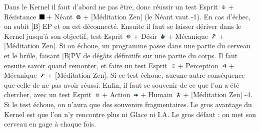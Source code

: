 \documentclass[11pt,twoside,a4paper]{article}
\def\imgESPRI{\includegraphics[width=0.25cm]{../../../../../imgGraphics/rolePlayingGame/SimulacreS/mini12x12/esprit.png} }
\def\imgPERCE{\includegraphics[width=0.25cm]{../../../../../imgGraphics/rolePlayingGame/SimulacreS/mini12x12/perception.png} }
\def\imgACTIO{\includegraphics[width=0.25cm]{../../../../../imgGraphics/rolePlayingGame/SimulacreS/mini12x12/action.png} }
\def\imgDESIR{\includegraphics[width=0.25cm]{../../../../../imgGraphics/rolePlayingGame/SimulacreS/mini12x12/desir.png} }
\def\imgRESIS{\includegraphics[width=0.25cm]{../../../../../imgGraphics/rolePlayingGame/SimulacreS/mini12x12/resistance.png} }
\def\imgHUMAI{\includegraphics[width=0.25cm]{../../../../../imgGraphics/rolePlayingGame/SimulacreS/mini12x12/humain.png} }
\def\imgMECAN{\includegraphics[width=0.25cm]{../../../../../imgGraphics/rolePlayingGame/SimulacreS/mini12x12/mecanique.png} }
\def\imgNEANT{\includegraphics[width=0.25cm]{../../../../../imgGraphics/rolePlayingGame/SimulacreS/mini12x12/neant.png} }
\begin{document}
\begin{multicols}{3}
{	Dans le Kernel il faut d'abord ne pas {\^e}tre, donc r{\'e}ussir un test Esprit~\imgESPRI + R{\'e}sistance~\imgRESIS + N{\'e}ant~\imgNEANT + [M{\'e}ditation Zen] (le N{\'e}ant vaut -1). En cas d'{\'e}chec, on subit [B] EP et on est d{\'e}connect{\'e}. Ensuite il faut se laisser d{\'e}river dans le Kernel jusqu'{\`a} son objectif, test Esprit~\imgESPRI + D{\'e}sir~\imgDESIR + M{\'e}canique~\imgMECAN + [M{\'e}ditation Zen]. Si on {\'e}choue, un programme passe dans une partie du cerveau et le br{\^u}le, faisant [B]PV de d{\'e}g{\^a}ts d{\'e}finitifs sur une partie du corps. Il faut ensuite savoir quand remonter, et faire un test Esprit~\imgESPRI + Perception~\imgPERCE + M{\'e}canique~\imgMECAN + [M{\'e}ditation Zen]. Si ce test {\'e}choue, aucune autre cons{\'e}quence que celle de ne pas avoir r{\'e}ussi. Enfin, il faut se souvenir de ce que l'on a {\'e}t{\'e} chercher, avec un test Esprit~\imgESPRI + Action~\imgACTIO + Humain~\imgHUMAI + [M{\'e}ditation Zen] -4. Si le test {\'e}choue, on n'aura que des souvenirs fragmentaires. Le gros avantage du Kernel est que l'on n'y rencontre plus ni Glace ni I.A. Le gros d{\'e}faut : on met son cerveau en gage {\`a} chaque fois.~\\
} %
\end{multicols} 

\clearpage
\end{document}
